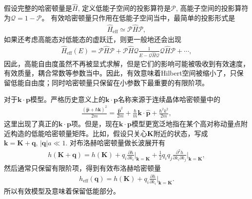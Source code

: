 \documentclass[10pt, oneside]{article}
\begin{document}
假设完整的哈密顿量是\(\hat{H}\), 定义低能子空间的投影算符是\(\mathcal{P}\), 高能子空间的投影算符为\(\mathcal{Q} = 1 - 	\mathcal{P}\)。	有效哈密顿量只作用在低能子空间当中，最简单的投影形式是
\begin{align}
	\hat{H}_{\mathrm{eff}} \simeq \mathcal{P} \hat{H} \mathcal{P},
\end{align}
如果还考虑高能态对低能态的虚跃迁，则更一般地还会出现
\begin{align}
	\hat{H}_{\mathrm{eff}} \left(E\right) = \mathcal{P} \hat{H} \mathcal{P} + \mathcal{P} \hat{H} \mathcal{Q} \frac{1}{E - \mathcal{Q} \hat{H} \mathcal{Q}} \mathcal{Q} \hat{H} \mathcal{P} + \cdots,
\end{align}
因此，高能自由度虽然不再被显式求解，但是它们的影响可能被吸收到有效速度，有效质量，耦合常数等参数当中。因此，有效意味着Hilbert空间被缩小了，只保留低能自由度；同时哈密顿量只保留在小参数下最重要的有限阶项。

对于\(\bm{k} \cdot \bm{p}\)模型。严格历史意义上的\(\bm{k} \cdot \bm{p}\)名称来源于连续晶体哈密顿量中的
\begin{align}
	\frac{\left(\hat{\bm{p}}+ \hbar \bm{k}\right)^{2}}{2 m} = \frac{\hat{\bm{p}}^{2}}{2m} + \frac{\hbar}{m} \bm{k} \cdot \hat{\bm{p}} + \frac{\hbar^{2} k^{2}} {2m},
\end{align}
这里出现了真正的\(\bm{k} \cdot \bm{p}\)项。但是，现在\(\bm{k} \cdot \bm{p}\)模型更宽泛地指在某个高对称动量点附近构造的低能哈密顿量矩阵。比如，假设只关心\(\bm{K}\)附近的状态，写成\(\bm{k} = \bm{K} + \bm{q}, \, \left|\bm{q}\right| a \ll 1\). 对布洛赫哈密顿量做长波展开有
\begin{align}
	h \left(\bm{K} + \bm{q}\right) = h \left(\bm{K}\right) + q_i \frac{\partial h}{\partial k_i} \bigg|_{\bm{k} = \bm{K}} + \frac{1}{2} q_i q_j \frac{\partial^{2} h}{\partial k_i \partial k_j} \bigg|_{\bm{k} = \bm{K}} ,
\end{align}
然后通常只保留有限阶项，得到有效布洛赫哈密顿量
\begin{align}
	h_{\mathrm{eff}} \left(\bm{q}\right) = h \left(\bm{K}\right) + q_i \frac{\partial h}{\partial k_i} \bigg|_{\bm{k} = \bm{K}}.
\end{align}
所以有效模型及意味着保留低能部分。
\end{document}

